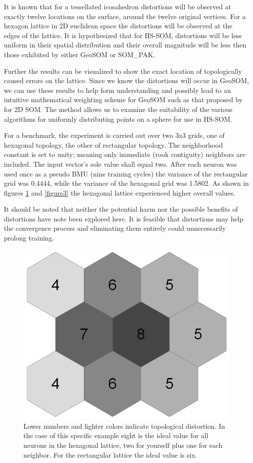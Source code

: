 \documentclass[12pt]{article}
\begin{document}
It is known that for a tessellated icosahedron distortions
will be observed at exactly twelve locations on the surface, around the twelve
original vertices.  For a hexagon lattice in 2D euclidean space the
distortions will be observed at the edges of the lattice.  It is hypothesized
that for HS-SOM, distortions will be less uniform in their spatial
distribution and their overall magnitude will be less then those exhibited by
either GeoSOM or SOM\_PAK.

Further the results can be visualized to show the exact location of
topologically caused errors on the lattice.  Since we know the distortions
will occur in GeoSOM, we can use these results to help form understanding and
possibly lead to an intuitive mathematical weighting scheme for GeoSOM such as
that proposed by \cite{Kohonen2000} for 2D SOM. The method allows us to
examine the suitability of the various algorithms for uniformly distributing
points on a sphere for use in HS-SOM.

For a benchmark, the experiment is carried out over two 3x3 grids, one of
hexagonal topology, the other of rectangular topology. The neighborhood
constant is set to unity; meaning only immediate (rook contiguity) neighbors
are included. The input vector's sole value shall equal two. After each
neuron was used once as a pseudo BMU (nine training cycles) the variance of
the rectangular grid was 0.4444, while the variance of the hexagonal grid was
1.5802. As shown in figures \ref{figure2} and \ref{figure3} the hexagonal lattice
experienced higher overall values.

It should be noted that neither the potential harm nor the possible benefits
of distortions have note been explored here.  It is feasible that distortions
may help the convergence process and eliminating them entirely could
unnecessarily prolong training.

\begin{figure}
\centering
\includegraphics[width=0.4\linewidth]{figure_hex.png}
\caption{Lower numbers and lighter colors indicate topological distortion.
In the case of this specific example eight is the ideal value for all neurons
in the hexagonal lattice, two for yourself plus one for each neighbor.  For
the rectangular lattice the ideal value is six.}
\label{figure2}
\end{figure}
\end{document}
